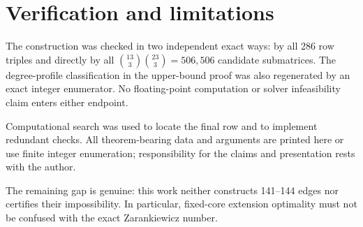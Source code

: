 \documentclass[11pt]{article}
\begin{document}
\section{Verification and limitations}
The construction was checked in two independent exact ways: by all 286 row
triples and directly by all
$\binom{13}{3}\binom{23}{3}=506{,}506$ candidate submatrices. The degree-profile
classification in the upper-bound proof was also regenerated by an exact
integer enumerator. No floating-point computation or solver infeasibility
claim enters either endpoint.

Computational search was used to locate the final row and to implement
redundant checks. All theorem-bearing data and arguments are printed here or
use finite integer enumeration; responsibility for the claims and
presentation rests with the author.

The remaining gap is genuine: this work neither constructs 141--144 edges nor
certifies their impossibility. In particular, fixed-core extension optimality
must not be confused with the exact Zarankiewicz number.



\end{document}
